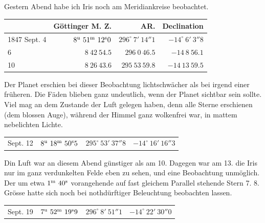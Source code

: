 Gestern Abend habe ich Iris noch am Meridiankreise beobachtet.

\begin{center}
\setlength{\tabcolsep}{4pt}
\begin{tabular}{l|r|r|r}
 & Göttinger M. Z. & AR. & Declination \\\hline
1847 Sept. 4 & $8^{\rm u}\ 51^{\rm m}\ 12^{\rm s}0$ & $296^\circ\ 7'\ 14''1$ & $-14^\circ\ 6'\ 3''8$ \\
\hfill 6 & $8\ 42\ 54.5$ & $296\ 0\ 46.5$ & $-14\ 8\ 56.1$ \\
\hfill 10 & $8\ 26\ 43.6$ & $295\ 53\ 59.8$ & $-14\ 13\ 59.5$ \\
\end{tabular}
\end{center}

Der Planet erschien bei dieser Beobachtung lichtschwächer als bei irgend einer früheren. Die Fäden blieben ganz undeutlich, wenn der Planet sichtbar sein sollte. Viel mag an dem Zustande der Luft gelegen haben, denn alle Sterne erschienen (dem blossen Auge), während der Himmel ganz wolkenfrei war, in mattem nebelichten Lichte.

\begin{center}
\begin{tabular}{l|r|r|r}
Sept. 12 & $8^{\rm u}\ 18^{\rm m}\ 50^{\rm s}5$ & $295^\circ\ 53'\ 37''8$ & $-14^\circ\ 16'\ 16''3$ \\
\end{tabular}
\end{center}

Din Luft war an diesem Abend günstiger als am 10. Dagegen war am 13. die Iris nur im ganz verdunkelten Felde eben zu sehen, und eine Beobachtung unmöglich. Der um etwa $1^{\rm m}\ 40^{\rm s}$ vorangehende auf fast gleichem Parallel stehende Stern 7. 8. Grösse hatte sich noch bei nothdürftiger Beleuchtung beobachten lassen.

\begin{center}
\begin{tabular}{l|r|r|r}
Sept. 19 & $7^{\rm u}\ 52^{\rm m}\ 19^{\rm s}9$ & $296^\circ\ 8'\ 51''1$ & $-14^\circ\ 22'\ 30''0$ \\
\end{tabular}
\end{center}
